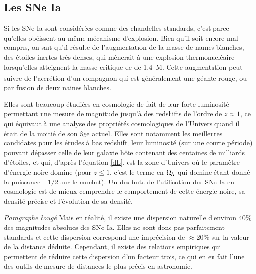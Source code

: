 \documentclass[a4paper, 12pt, svgnames]{article}
\newcommand{\mr}[1]{{\textcolor[rgb]{0.80,0.10,0.1}{#1}}}
\begin{document}
%


\subsection{Les SNe Ia}\label{ssec:sneia}
Si les SNe Ia sont considérées comme des chandelles standards, c'est parce
qu'elles obéissent au même mécanisme d'explosion. Bien qu'il soit encore mal
compris, on sait qu'il résulte de l'augmentation de la masse de naines
blanches, des étoiles inertes très denses, qui mènerait à une explosion
thermonucléaire lorsqu'elles atteignent la masse critique de 
de \SI{1.4}{M_\odot}. Cette augmentation peut suivre de l'accrétion d'un
compagnon qui est généralement une géante rouge, ou par fusion de deux naines
blanches.

Elles sont beaucoup étudiées en cosmologie de fait de leur forte luminosité
permettant une mesure de magnitude jusqu'à des redshifts de l'ordre de $z
\approx 1$, ce qui équivaut à une analyse des propriétés cosmologiques de
l'Univers quand il était de la moitié de son âge actuel. Elles sont notamment
les meilleures candidates pour les études à bas redshift, leur luminosité (sur
une courte période) pouvant dépasser celle de leur galaxie hôte contenant des
centaines de milliards d'étoiles,  et qui, d'après l'équation \ref{dL}, est la
zone d'Univers où le paramètre d'énergie noire domine (pour $z \leq 1$, c'est le
terme en $\Omega_\Lambda$ qui domine étant donné la puissance $-1/2$ sur le crochet). Un
des buts de l'utilisation des SNe Ia en cosmologie est de mieux comprendre le
comportement de cette énergie noire, sa densité précise et l'évolution de sa
densité.

\mr{\textit{Paragraphe bougé}} Mais en réalité, il existe une dispersion
naturelle d'environ 40\% des magnitudes absolues des SNe Ia. Elles ne sont donc
pas parfaitement standards et cette dispersion \mr{correspond une imprécision de
$\approx$20\% sur la valeur de la distance déduite. Cependant, il existe des
relations empiriques qui permettent de réduire cette dispersion d'un facteur
trois, ce qui en en fait l'une des outils de mesure de distances le plus précis
en astronomie.}
\end{document}
